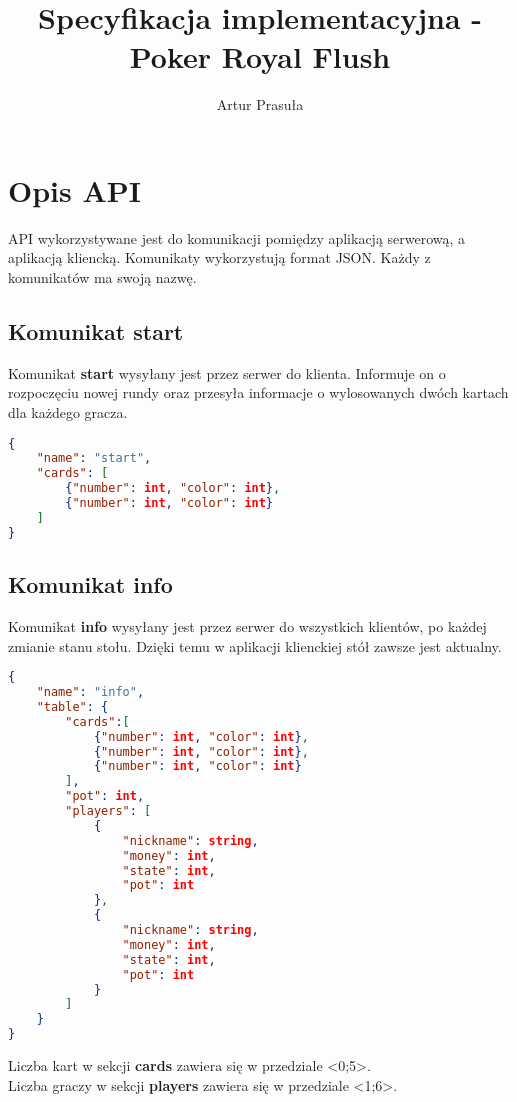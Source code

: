 \documentclass{article}
\title{Specyfikacja implementacyjna - Poker Royal Flush}
\author{Artur Prasuła}
\begin{document}
\maketitle
\tableofcontents
\newpage


\section{Opis API} %
    API wykorzystywane jest do komunikacji pomiędzy aplikacją serwerową, a aplikacją kliencką.
    Komunikaty wykorzystują format JSON. Każdy z komunikatów ma swoją nazwę.
    
    \subsection{Komunikat start}
        Komunikat \textbf{start} wysyłany jest przez serwer do klienta.
        Informuje on o rozpoczęciu nowej rundy oraz przesyła informacje o wylosowanych dwóch kartach dla każdego gracza.
        \begin{lstlisting}[language=json,firstnumber=1]
{
    "name": "start",
    "cards": [
        {"number": int, "color": int},
        {"number": int, "color": int}
    ]
}
        \end{lstlisting}
    
    \subsection{Komunikat info}
        Komunikat \textbf{info} wysyłany jest przez serwer do wszystkich klientów, po każdej zmianie stanu stołu.
        Dzięki temu w aplikacji klienckiej stół zawsze jest aktualny.
    
        \begin{lstlisting}[language=json,firstnumber=1]
{
    "name": "info",
    "table": {
        "cards":[
            {"number": int, "color": int},
            {"number": int, "color": int},
            {"number": int, "color": int}
        ],
        "pot": int,
        "players": [
            {
                "nickname": string,
                "money": int,
                "state": int,
                "pot": int
            },
            {
                "nickname": string,
                "money": int,
                "state": int,
                "pot": int
            }
        ]
    }
}
    \end{lstlisting}
    Liczba kart w sekcji \textbf{cards} zawiera się w przedziale <0;5>.\\
    Liczba graczy w sekcji \textbf{players} zawiera się w przedziale <1;6>.
    
\end{document}
